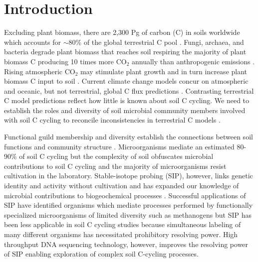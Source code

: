 \section{Introduction}
Excluding plant biomass, there are 2,300 Pg of carbon (C) in soils
worldwide which accounts for $\sim$80\% of the global terrestrial C pool
\citep{Amundson_2001,BATJES_1996}. Fungi, archaea, and bacteria degrade plant
biomass that reaches soil respiring the majority of plant biomass C producing
10 times more CO$_{2}$ annually than anthropogenic emissions
\citep{chapin2002principles}. Rising atmospheric CO$_{2}$ may stimulate plant
growth and in turn increase plant biomass C input to soil
\citep{Groenigen_2006}. Current climate change models concur on atmospheric and
oceanic, but not terrestrial, global C flux predictions
\citep{Friedlingstein_2006}. Contrasting terrestrial C model predictions
reflect how little is known about soil C cycling. We need to establish the
roles and diversity of soil microbial community members involved with soil
C cycling to reconcile inconsistencies in terrestrial C models
\citep{Neff_2001,McGuire2010}.

Functional guild membership and diversity establish the connections between
soil functions and community structure \citep{O_Donnell_2002}. Microorganisms
mediate an estimated 80-90\% of soil C cycling
\citep{ColemanCrossley_1996,Nannipieri_2003} but the complexity of soil
obfuscates microbial contributions to soil C cycling and the majority of
microorganisms resist cultivation in the laboratory. Stable-isotope probing
(SIP), however, links genetic identity and activity without cultivation and has
expanded our knowledge of microbial contributions to biogeochemical processes
\citep{Chen_Murrell_2010}. Successful applications of SIP have identified
organisms which mediate processes performed by functionally specialized
microorganisms of limited diversity such as methanogens \citep{Lu_2005} but SIP
has been less applicable in soil C cycling studies because simultaneous
labeling of many different organisms has necessitated prohibitory resolving
power. High throughput DNA sequencing technology, however, improves the
resolving power of SIP enabling exploration of complex soil C-cycling
processes.

